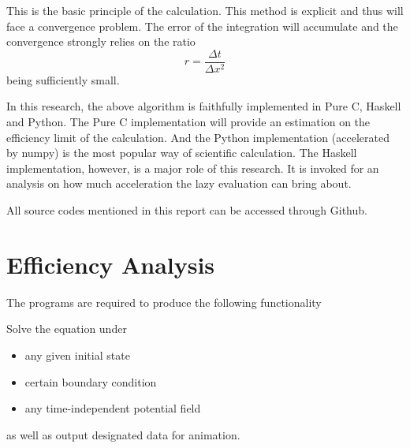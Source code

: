 \documentclass[11pt]{article}
\begin{document}
This is the basic principle of the calculation. This method is explicit and thus will face a convergence problem. The error of the integration will accumulate and the convergence strongly relies on the ratio
\begin{equation}
	r = \frac{\Delta t}{\Delta x^2}
\end{equation}
being sufficiently small.

In this research, the above algorithm is faithfully implemented in Pure C, Haskell and Python. The Pure C implementation will provide an estimation on the efficiency limit of the calculation. And the Python implementation (accelerated by numpy) is the most popular way of scientific calculation. The Haskell implementation, however, is a major role of this research. It is invoked for an analysis on how much acceleration the lazy evaluation can bring about. 

All source codes mentioned in this report can be accessed through Github. 

\section{Efficiency Analysis}

The programs are required to produce the following functionality

Solve the equation under
\vspace{-5pt}
\begin{itemize}
	\setlength\itemsep{-3pt}
	\item any given initial state
	\item certain boundary condition
	\item any time-independent potential field
\end{itemize}
\vspace{-5pt}
as well as output designated data for animation.

\vspace{5pt}
\end{document}

